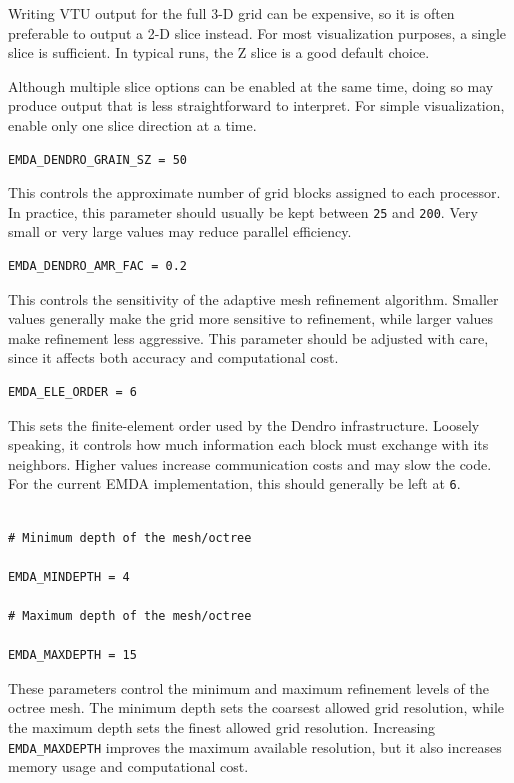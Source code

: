 Writing VTU output for the full 3-D grid can be expensive, so it is often
preferable to output a 2-D slice instead. For most visualization purposes, a
single slice is sufficient. In typical runs, the Z slice is a good default
choice.

Although multiple slice options can be enabled at the same time, doing so may
produce output that is less straightforward to interpret. For simple
visualization, enable only one slice direction at a time.

\begin{verbatim}
EMDA_DENDRO_GRAIN_SZ = 50
\end{verbatim}

This controls the approximate number of grid blocks assigned to each processor.
In practice, this parameter should usually be kept between \texttt{25} and
\texttt{200}. Very small or very large values may reduce parallel efficiency.

\begin{verbatim}
EMDA_DENDRO_AMR_FAC = 0.2
\end{verbatim}

This controls the sensitivity of the adaptive mesh refinement algorithm. Smaller
values generally make the grid more sensitive to refinement, while larger
values make refinement less aggressive. This parameter should be adjusted with
care, since it affects both accuracy and computational cost.

\begin{verbatim}
EMDA_ELE_ORDER = 6
\end{verbatim}

This sets the finite-element order used by the Dendro infrastructure. Loosely
speaking, it controls how much information each block must exchange with its
neighbors. Higher values increase communication costs and may slow the code. For
the current EMDA implementation, this should generally be left at
\texttt{6}.

\begin{verbatim}

# Minimum depth of the mesh/octree

EMDA_MINDEPTH = 4

# Maximum depth of the mesh/octree

EMDA_MAXDEPTH = 15
\end{verbatim}

These parameters control the minimum and maximum refinement levels of the
octree mesh. The minimum depth sets the coarsest allowed grid resolution, while
the maximum depth sets the finest allowed grid resolution. Increasing
\texttt{EMDA\_MAXDEPTH} improves the maximum available resolution, but it also
increases memory usage and computational cost.

